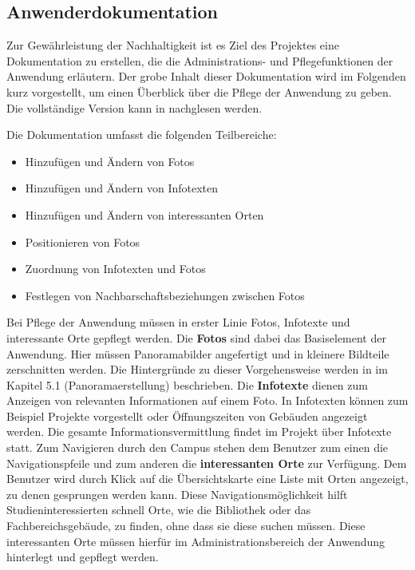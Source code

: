 \subsection{Anwenderdokumentation}
\label{sec:Anwenderdokumentation}

Zur Gewährleistung der Nachhaltigkeit ist es Ziel des Projektes eine
Dokumentation zu erstellen, die die Administrations- und Pflegefunktionen der
Anwendung erläutern. Der grobe Inhalt dieser Dokumentation wird im Folgenden
kurz vorgestellt, um einen Überblick über die Pflege der Anwendung zu geben. Die
vollständige Version kann in \citet{projektdokumentation2014} nachglesen werden.

Die Dokumentation umfasst die folgenden Teilbereiche:

\begin{itemize}
  \item Hinzufügen und Ändern von Fotos
  \item Hinzufügen und Ändern von Infotexten
  \item Hinzufügen und Ändern von interessanten Orten
  \item Positionieren von Fotos
  \item Zuordnung von Infotexten und Fotos
  \item Festlegen von Nachbarschaftsbeziehungen zwischen Fotos
\end{itemize}

Bei Pflege der Anwendung müssen in erster Linie Fotos, Infotexte und interessante Orte gepflegt werden. Die \textbf{Fotos}
sind dabei das Basiselement der Anwendung. Hier müssen Panoramabilder angefertigt und in kleinere Bildteile zerschnitten
werden. Die Hintergründe zu dieser Vorgehensweise werden in \citet{modelierungUndBetrieb2014} im
Kapitel 5.1 (Panoramaerstellung) beschrieben.
Die \textbf{Infotexte} dienen zum Anzeigen von relevanten Informationen auf einem Foto. In Infotexten können
zum Beispiel Projekte vorgestellt oder Öffnungszeiten von Gebäuden angezeigt werden. Die gesamte Informationsvermittlung
findet im Projekt über Infotexte statt.
Zum Navigieren durch den Campus stehen dem Benutzer zum einen die Navigationspfeile und zum anderen die
\textbf{interessanten Orte} zur Verfügung. Dem Benutzer wird durch Klick auf die
Übersichtskarte eine Liste mit Orten angezeigt, zu denen gesprungen werden kann.
Diese Navigationsmöglichkeit hilft Studieninteressierten schnell Orte, wie die
Bibliothek oder das Fachbereichsgebäude, zu finden, ohne dass sie diese suchen
müssen. Diese interessanten Orte müssen hierfür im Administrationsbereich der
Anwendung hinterlegt und gepflegt werden.

